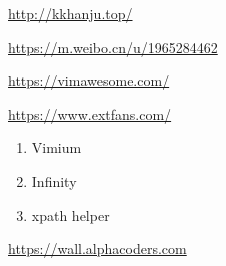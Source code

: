 \documentclass[a4paper]{ctexart}    %
\begin{document}
\begin{tcolorbox}[
         colback=red!5!white,
         colframe=teal,
         title=\textbf{韩剧网}
    ]
    \href{http://kkhanju.top/}{http://kkhanju.top/}
\end{tcolorbox}
\begin{tcolorbox}[
         colback=red!5!white,
         colframe=teal,
         title=\textbf{韩国电影微博}
    ]
    \href{https://m.weibo.cn/u/1965284462}{https://m.weibo.cn/u/1965284462}
\end{tcolorbox}
\begin{tcolorbox}[
         colback=red!5!white,
         colframe=teal,
         title=\textbf{vimawesome}
    ]
    \href{https://vimawesome.com/}{https://vimawesome.com/}
\end{tcolorbox}
\begin{tcolorbox}[
         colback=red!5!white,
         colframe=teal,
         title=\textbf{Extfans谷歌浏览器扩展}
    ]
    \href{https://www.extfans.com/}{https://www.extfans.com/}
    \begin{enumerate}
        \item Vimium
        \item Infinity
        \item xpath helper
    \end{enumerate}

\end{tcolorbox}


\begin{tcolorbox}[
         colback=red!5!white,
         colframe=teal,
         title=\textbf{Wallpaper}
    ]
    \href{https://wall.alphacoders.com}{https://wall.alphacoders.com}
\end{tcolorbox}
\end{document}
